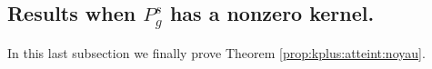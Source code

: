 \documentclass[10pt]{amsart}
\numberwithin{equation}{section}
\def\ker{{\mathop{\rm Ker}}}
\theoremstyle{plain}
\newtheorem{prop}[theo]{Proposition}%
\theoremstyle{remark}
\begin{document}
 
 

\subsection{Results when $P_g^s$ has a nonzero kernel.}

In this last subsection we finally prove Theorem \ref{prop:kplus:atteint:noyau}.

%
\end{document}
